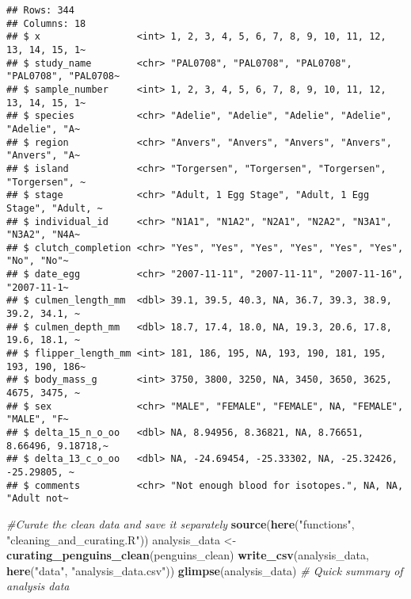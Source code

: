 \documentclass[
]{article}
\newenvironment{Shaded}{\begin{snugshade}}{\end{snugshade}}
\newcommand{\CommentTok}[1]{\textcolor[rgb]{0.56,0.35,0.01}{\textit{#1}}}
\newcommand{\FunctionTok}[1]{\textcolor[rgb]{0.13,0.29,0.53}{\textbf{#1}}}
\newcommand{\NormalTok}[1]{#1}
\newcommand{\OtherTok}[1]{\textcolor[rgb]{0.56,0.35,0.01}{#1}}
\newcommand{\StringTok}[1]{\textcolor[rgb]{0.31,0.60,0.02}{#1}}
\begin{document}
\begin{verbatim}
## Rows: 344
## Columns: 18
## $ x                 <int> 1, 2, 3, 4, 5, 6, 7, 8, 9, 10, 11, 12, 13, 14, 15, 1~
## $ study_name        <chr> "PAL0708", "PAL0708", "PAL0708", "PAL0708", "PAL0708~
## $ sample_number     <int> 1, 2, 3, 4, 5, 6, 7, 8, 9, 10, 11, 12, 13, 14, 15, 1~
## $ species           <chr> "Adelie", "Adelie", "Adelie", "Adelie", "Adelie", "A~
## $ region            <chr> "Anvers", "Anvers", "Anvers", "Anvers", "Anvers", "A~
## $ island            <chr> "Torgersen", "Torgersen", "Torgersen", "Torgersen", ~
## $ stage             <chr> "Adult, 1 Egg Stage", "Adult, 1 Egg Stage", "Adult, ~
## $ individual_id     <chr> "N1A1", "N1A2", "N2A1", "N2A2", "N3A1", "N3A2", "N4A~
## $ clutch_completion <chr> "Yes", "Yes", "Yes", "Yes", "Yes", "Yes", "No", "No"~
## $ date_egg          <chr> "2007-11-11", "2007-11-11", "2007-11-16", "2007-11-1~
## $ culmen_length_mm  <dbl> 39.1, 39.5, 40.3, NA, 36.7, 39.3, 38.9, 39.2, 34.1, ~
## $ culmen_depth_mm   <dbl> 18.7, 17.4, 18.0, NA, 19.3, 20.6, 17.8, 19.6, 18.1, ~
## $ flipper_length_mm <int> 181, 186, 195, NA, 193, 190, 181, 195, 193, 190, 186~
## $ body_mass_g       <int> 3750, 3800, 3250, NA, 3450, 3650, 3625, 4675, 3475, ~
## $ sex               <chr> "MALE", "FEMALE", "FEMALE", NA, "FEMALE", "MALE", "F~
## $ delta_15_n_o_oo   <dbl> NA, 8.94956, 8.36821, NA, 8.76651, 8.66496, 9.18718,~
## $ delta_13_c_o_oo   <dbl> NA, -24.69454, -25.33302, NA, -25.32426, -25.29805, ~
## $ comments          <chr> "Not enough blood for isotopes.", NA, NA, "Adult not~
\end{verbatim}

\begin{Shaded}
\begin{Highlighting}[]
\CommentTok{\#Curate the clean data and save it separately}
\FunctionTok{source}\NormalTok{(}\FunctionTok{here}\NormalTok{(}\StringTok{"functions"}\NormalTok{, }\StringTok{"cleaning\_and\_curating.R"}\NormalTok{))}
\NormalTok{analysis\_data }\OtherTok{\textless{}{-}} \FunctionTok{curating\_penguins\_clean}\NormalTok{(penguins\_clean)}
\FunctionTok{write\_csv}\NormalTok{(analysis\_data, }\FunctionTok{here}\NormalTok{(}\StringTok{"data"}\NormalTok{, }\StringTok{"analysis\_data.csv"}\NormalTok{))}
\FunctionTok{glimpse}\NormalTok{(analysis\_data) }\CommentTok{\# Quick summary of analysis data}
\end{Highlighting}
\end{Shaded}
\end{document}

